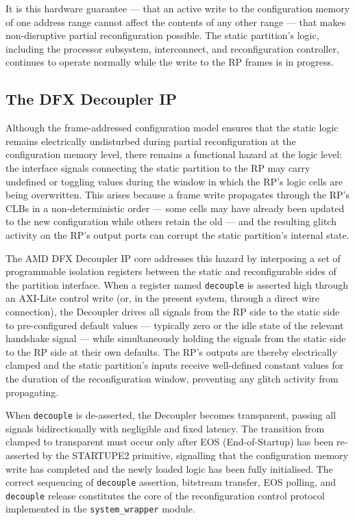 It is this hardware guarantee — that an active write to the configuration memory of one address range cannot affect the contents of any other range — that makes non-disruptive partial reconfiguration possible. The static partition's logic, including the processor subsystem, interconnect, and reconfiguration controller, continues to operate normally while the write to the RP frames is in progress.

\subsection{The DFX Decoupler IP}

Although the frame-addressed configuration model ensures that the static logic remains electrically undisturbed during partial reconfiguration at the configuration memory level, there remains a functional hazard at the logic level: the interface signals connecting the static partition to the RP may carry undefined or toggling values during the window in which the RP's logic cells are being overwritten. This arises because a frame write propagates through the RP's CLBs in a non-deterministic order — some cells may have already been updated to the new configuration while others retain the old — and the resulting glitch activity on the RP's output ports can corrupt the static partition's internal state.

The AMD DFX Decoupler IP core addresses this hazard by interposing a set of programmable isolation registers between the static and reconfigurable sides of the partition interface. When a register named \texttt{decouple} is asserted high through an AXI-Lite control write (or, in the present system, through a direct wire connection), the Decoupler drives all signals from the RP side to the static side to pre-configured default values — typically zero or the idle state of the relevant handshake signal — while simultaneously holding the signals from the static side to the RP side at their own defaults. The RP's outputs are thereby electrically clamped and the static partition's inputs receive well-defined constant values for the duration of the reconfiguration window, preventing any glitch activity from propagating.

When \texttt{decouple} is de-asserted, the Decoupler becomes transparent, passing all signals bidirectionally with negligible and fixed latency. The transition from clamped to transparent must occur only after EOS (End-of-Startup) has been re-asserted by the STARTUPE2 primitive, signalling that the configuration memory write has completed and the newly loaded logic has been fully initialised. The correct sequencing of \texttt{decouple} assertion, bitstream transfer, EOS polling, and \texttt{decouple} release constitutes the core of the reconfiguration control protocol implemented in the \texttt{system\_wrapper} module.

